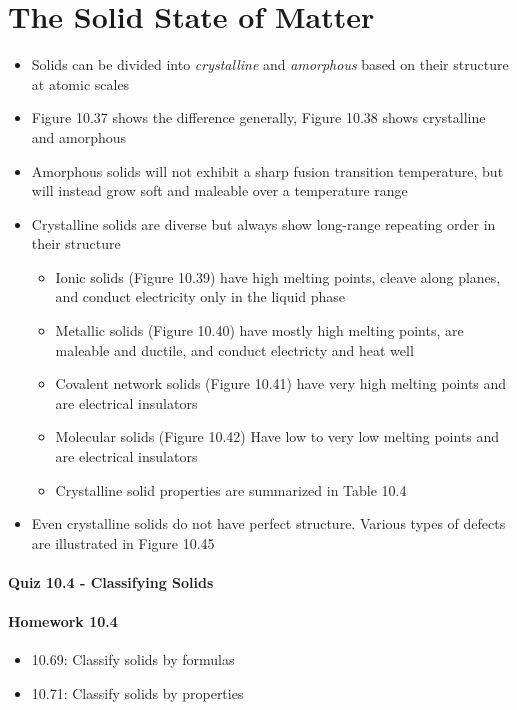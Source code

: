 \documentclass[12pt, openany, letterpaper]{memoir}
\begin{document}
\section{The Solid State of Matter}
\begin{itemize}
  \item Solids can be divided into \emph{crystalline} and \emph{amorphous} based on their structure at atomic scales
  \item Figure 10.37 shows the difference generally, Figure 10.38 shows crystalline and amorphous 
  \item Amorphous solids will not exhibit a sharp fusion transition temperature, but will instead grow soft and maleable over a temperature range
  \item Crystalline solids are diverse but always show long-range repeating order in their structure
  \begin{itemize}
    \item Ionic solids (Figure 10.39) have high melting points, cleave along planes, and conduct electricity only in the liquid phase
    \item Metallic solids (Figure 10.40) have mostly high melting points, are maleable and ductile, and conduct electricty and heat well
    \item Covalent network solids (Figure 10.41) have very high melting points and are electrical insulators
    \item Molecular solids (Figure 10.42) Have low to very low melting points and are electrical insulators
    \item Crystalline solid properties are summarized in Table 10.4
  \end{itemize}
  \item Even crystalline solids do not have perfect structure. Various types of defects are illustrated in Figure 10.45
\end{itemize}
\paragraph*{Quiz 10.4 - Classifying Solids}
\paragraph*{Homework 10.4}
\begin{itemize}
  \item 10.69: Classify solids by formulas
  \item 10.71: Classify solids by properties
\end{itemize}
\end{document}
